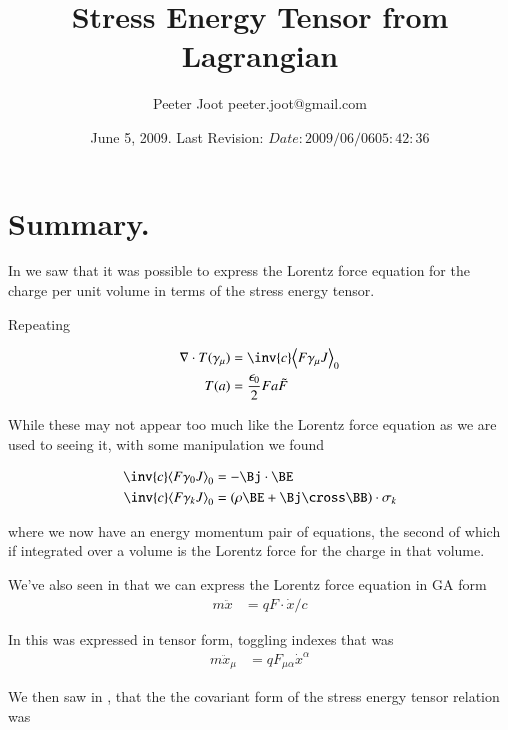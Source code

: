 \documentclass{article}
\title{Stress Energy Tensor from Lagrangian}\label{chap:stress_energy_noethers}
\author{Peeter Joot \quad peeter.joot@gmail.com }
\date{ June 5, 2009.  Last Revision: $Date: 2009/06/06 05:42:36 $ }
\begin{document}
\maketitle{}
\tableofcontents
\section{ Summary. }

In 
\cite{PJstressEnergyLorentz} 
we saw that it was
possible to express the Lorentz force equation for the charge per unit
volume in terms of the stress energy tensor.

Repeating 

\begin{align}
\grad \cdot T(\gamma_\mu) &= \inv{c} \gpgradezero{ F \gamma_\mu J } \\
T(a) &= \frac{\epsilon_0}{2} F a \tilde{F}
\end{align}

While these
may not appear too much like the Lorentz force equation as we are used
to seeing it, with some manipulation we found 

\begin{align}
\inv{c} \gpgradezero{ F \gamma_0 J } &= -\Bj \cdot \BE \\
\inv{c} \gpgradezero{ F \gamma_k J } &= (\rho \BE + \Bj \cross \BB) \cdot \sigma_k
\end{align}

where we now have an energy momentum pair of equations, the second
of which if integrated over a volume is the Lorentz force for the charge
in that volume.

We've also seen in
that we can express the Lorentz force equation in GA form
\begin{align}
m \ddot{x} &= q F \cdot \dot{x}/c
\end{align}

In 
this was expressed in tensor form, toggling indexes that was
\begin{align}
m \ddot{x}_\mu &= {q} F_{\mu\alpha} \dot{x}^\alpha
\end{align}

We then saw in
\cite{PJenMtensor}
, that the
the covariant form of the stress energy tensor relation was
\end{document}
